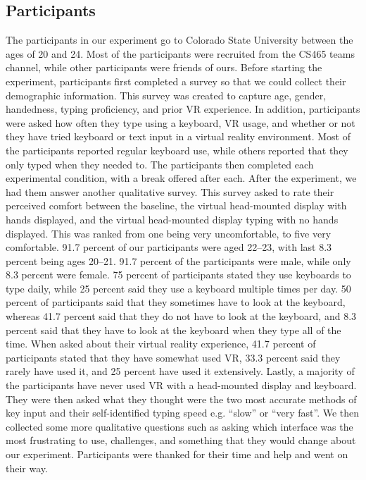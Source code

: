 \documentclass[acmlarge]{acmart}
\begin{document}
\subsection{Participants}

The participants in our experiment go to Colorado State University between the ages of 20 and 24. Most of the participants were recruited from the CS465 teams channel, while other participants were friends of ours. Before starting the experiment, participants first completed a survey so that we could collect their demographic information. This survey was created to capture age, gender, handedness, typing proficiency, and prior VR experience. In addition, participants were asked how often they type using a keyboard, VR usage, and whether or not they have tried keyboard or text input in a virtual reality environment. Most of the participants reported regular keyboard use, while others reported that they only typed when they needed to. The participants then completed each experimental condition, with a break offered after each. After the experiment, we had them answer another qualitative survey. This survey asked to rate their perceived comfort between the baseline, the virtual head-mounted display with hands displayed, and the virtual head-mounted display typing with no hands displayed. This was ranked from one being very uncomfortable, to five very comfortable. 91.7 percent of our participants were aged 22–23, with last 8.3 percent being ages 20–21. 91.7 percent of the participants were male, while only 8.3 percent were female. 75 percent of participants stated they use keyboards to type daily, while 25 percent said they use a keyboard multiple times per day. 50 percent of participants said that they sometimes have to look at the keyboard, whereas 41.7 percent said that they do not have to look at the keyboard, and 8.3 percent said that they have to look at the keyboard when they type all of the time. When asked about their virtual reality experience, 41.7 percent of participants stated that they have somewhat used VR, 33.3 percent said they rarely have used it, and 25 percent have used it extensively. Lastly, a majority of the participants have never used VR with a head-mounted display and keyboard. They were then asked what they thought were the two most accurate methods of key input and their self-identified typing speed e.g. “slow” or “very fast”. We then collected some more qualitative questions such as asking which interface was the most frustrating to use, challenges, and something that they would change about our experiment. Participants were thanked for their time and help and went on their way. 
\end{document}
